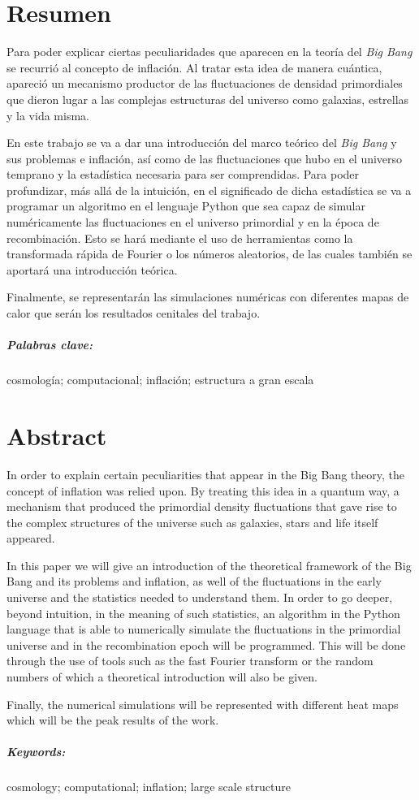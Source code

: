 \chapter*{Resumen}
Para poder explicar ciertas peculiaridades que aparecen en la teoría del \textit{Big Bang} se recurrió al concepto de inflación. Al tratar esta idea de manera cuántica, apareció un mecanismo productor de las fluctuaciones de densidad primordiales que dieron lugar a las complejas estructuras del universo como galaxias, estrellas y la vida misma.

En este trabajo se va a dar una introducción del marco teórico del \textit{Big Bang} y sus problemas e inflación, así como de las fluctuaciones que hubo en el universo temprano y la estadística necesaria para ser comprendidas. Para poder profundizar, más allá de la intuición, en el significado de dicha estadística se va a programar un algoritmo en el lenguaje Python que sea capaz de simular numéricamente las fluctuaciones en el universo primordial y en la época de recombinación. Esto se hará mediante el uso de herramientas como la transformada rápida de Fourier o los números aleatorios, de las cuales también se aportará una introducción teórica.

Finalmente, se representarán las simulaciones numéricas con diferentes mapas de calor que serán los resultados cenitales del trabajo.
\paragraph{Palabras clave:} cosmología; computacional; inflación; estructura a gran escala
\chapter*{Abstract}
In order to explain certain peculiarities that appear in the Big Bang theory, the concept of inflation was relied upon. By treating this idea in a quantum way, a mechanism that produced the primordial density fluctuations that gave rise to the complex structures of the universe such as galaxies, stars and life itself appeared.

In this paper we will give an introduction of the theoretical framework of the Big Bang and its problems and inflation, as well of the fluctuations in the early universe and the statistics needed to understand them. In order to go deeper, beyond intuition, in the meaning of such statistics, an algorithm in the Python language that is able to numerically simulate the fluctuations in the primordial universe and in the recombination epoch will be programmed. This will be done through the use of tools such as the fast Fourier transform or the random numbers of which a theoretical introduction will also be given.

Finally, the numerical simulations will be represented with different heat maps which will be the peak results of the work.
\paragraph{Keywords:} cosmology; computational; inflation; large scale structure